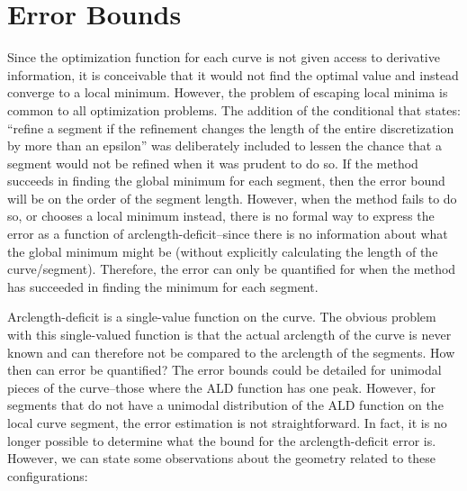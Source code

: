 \section{Error Bounds}
Since the optimization function for each curve is not given access to 
derivative information, it is conceivable that it would not find the 
optimal value and instead converge to a local minimum.  However, the 
problem of escaping local minima is common to all optimization problems.  
The addition of the conditional that states: ``refine a segment if the 
refinement changes the length of the entire discretization by more than an 
epsilon'' was deliberately included to lessen the chance that a segment 
would not be refined when it was prudent to do so.  If the method succeeds 
in finding the global minimum for each segment, then the error bound will 
be on the order of the segment length.  However, when the method fails to 
do so, or chooses a local minimum instead, there is no formal way to 
express the error as a function of arclength-deficit--since there is no 
information about what the global minimum might be (without explicitly 
calculating the length of the curve/segment).  Therefore, the error can 
only be quantified for when the method has succeeded in finding the 
minimum for each segment.

Arclength-deficit is a single-value function on the curve.  The obvious 
problem with this single-valued function is that the actual arclength of 
the curve is never known and can therefore not be compared to the 
arclength of the segments.  How then can error be quantified? The error 
bounds could be detailed for unimodal pieces of the curve--those where the 
ALD function has one peak.  However, for segments that do not have a 
unimodal distribution of the ALD function on the local curve segment, the 
error estimation is not straightforward.  In fact, it is no longer 
possible to determine what the bound for the arclength-deficit error is.  
However, we can state some observations about the geometry related to 
these configurations:

